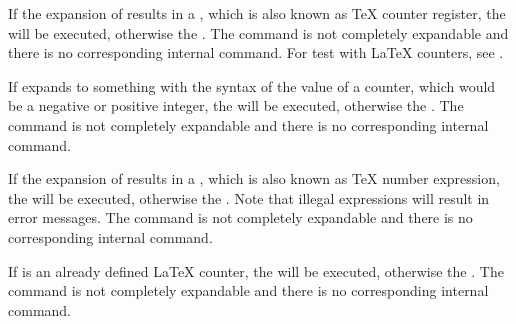 \begin{Declaration}
\end{Declaration}
%
If the expansion of results in
a , which is also known as \TeX{} counter register, the
 will be executed, otherwise the . The command is not completely expandable and there is no
corresponding internal command. For test with \LaTeX{} counters, see
.%
%

\begin{Declaration}
\end{Declaration}
%
If  expands to something with
the syntax of the value of a counter, which would be a negative or positive
integer, the  will be executed, otherwise the
. The command is not completely expandable and there
is no corresponding internal command.%
%

\begin{Declaration}
\end{Declaration}
%
If the expansion of results in
a , which is also known as \TeX{} number expression, the
 will be executed, otherwise the . Note that illegal expressions will
result in error messages. The command is not completely expandable and there
is no corresponding internal command.%
%

\begin{Declaration}
\end{Declaration}
%
If  is an already defined
\LaTeX{} counter, the  will be executed, otherwise
the .  The command is not completely expandable and
there is no corresponding internal command.%
%


